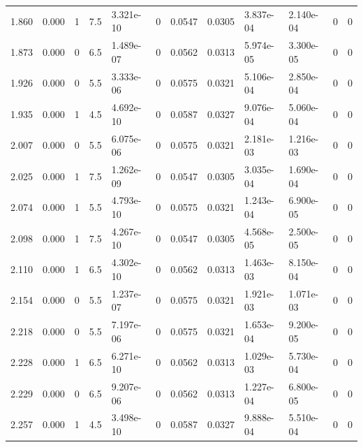 \documentclass[preview]{standalone}
\begin{document}
{{\begin{tabular}{L{1.2cm}C{1.2cm} C{0.3cm}C{0.5cm} C{1.4cm}C{1.4cm} C{1.4cm}C{1.4cm} C{1.6cm}C{1.6cm} C{1.6cm}C{1.6cm}}
  1.860  &  0.000  & 1     & 7.5 &  3.321e-10  & 0  &  0.0547&   0.0305& 3.837e-04 & 2.140e-04   &  0 & 0  \\ 
  1.873  &  0.000  & 0     & 6.5 &  1.489e-07  & 0  &  0.0562&   0.0313& 5.974e-05 & 3.300e-05   &  0 & 0  \\ 
  1.926  &  0.000  & 0     & 5.5 &  3.333e-06  & 0  &  0.0575&   0.0321& 5.106e-04 & 2.850e-04   &  0 & 0  \\ 
  1.935  &  0.000  & 1     & 4.5 &  4.692e-10  & 0  &  0.0587&   0.0327& 9.076e-04 & 5.060e-04   &  0 & 0  \\ 
  2.007  &  0.000  & 0     & 5.5 &  6.075e-06  & 0  &  0.0575&   0.0321& 2.181e-03 & 1.216e-03   &  0 & 0  \\ 
  2.025  &  0.000  & 1     & 7.5 &  1.262e-09  & 0  &  0.0547&   0.0305& 3.035e-04 & 1.690e-04   &  0 & 0  \\ 
  2.074  &  0.000  & 1     & 5.5 &  4.793e-10  & 0  &  0.0575&   0.0321& 1.243e-04 & 6.900e-05   &  0 & 0  \\ 
  2.098  &  0.000  & 1     & 7.5 &  4.267e-10  & 0  &  0.0547&   0.0305& 4.568e-05 & 2.500e-05   &  0 & 0  \\ 
  2.110  &  0.000  & 1     & 6.5 &  4.302e-10  & 0  &  0.0562&   0.0313& 1.463e-03 & 8.150e-04   &  0 & 0  \\ 
  2.154  &  0.000  & 0     & 5.5 &  1.237e-07  & 0  &  0.0575&   0.0321& 1.921e-03 & 1.071e-03   &  0 & 0  \\ 
  2.218  &  0.000  & 0     & 5.5 &  7.197e-06  & 0  &  0.0575&   0.0321& 1.653e-04 & 9.200e-05   &  0 & 0  \\ 
  2.228  &  0.000  & 1     & 6.5 &  6.271e-10  & 0  &  0.0562&   0.0313& 1.029e-03 & 5.730e-04   &  0 & 0  \\ 
  2.229  &  0.000  & 0     & 6.5 &  9.207e-06  & 0  &  0.0562&   0.0313& 1.227e-04 & 6.800e-05   &  0 & 0  \\ 
  2.257  &  0.000  & 1     & 4.5 &  3.498e-10  & 0  &  0.0587&   0.0327& 9.888e-04 & 5.510e-04   &  0 & 0  \\ 
\hline 
\end{tabular} 

}}
\end{document}
